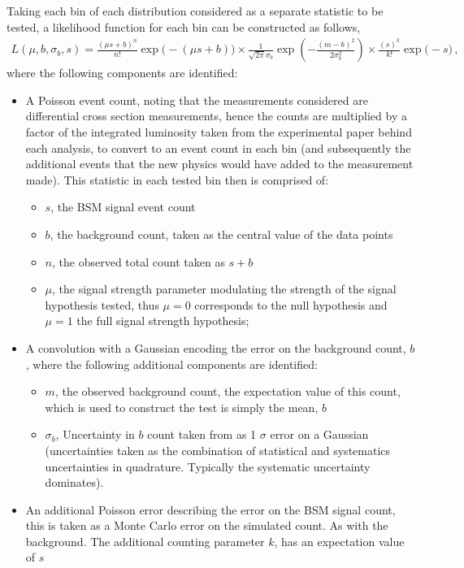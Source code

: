 \documentclass[floatfix]{article}
\begin{document}
Taking each bin of each distribution considered as a separate statistic to be tested, a likelihood function for each bin can be constructed as follows, 
\begin{align}
L(\mu, {b}, {\sigma}_{b}, {s}) = { \frac{(\mu s + b)^{n}}{n!} \exp\big(-(\mu s + b)\big) \times \frac{1}{\sqrt{2 \pi} \sigma_{b}} \exp\left(-\frac{(m - b)^{2}}{2 \sigma_{b}^{2}}\right)} \times \frac{(s)^{k}}{k!}\exp\big(-s\big)\,,
\end{align}
where the following components are identified:
\begin{itemize}
\item A Poisson event count, noting that the measurements considered are differential cross section measurements, hence the counts are multiplied by a factor of the integrated luminosity taken from the experimental paper behind each analysis, to convert to an event count in each bin (and subsequently the additional events that the new physics would have added to the measurement made). This statistic in each tested bin then is comprised of:
\begin{itemize}
\item $s$, the BSM signal event count
\item $b$, the background count, taken as the central value of the data points
\item $n$, the observed total count taken as $s+b$
\item $\mu$, the signal strength parameter modulating the strength of the signal hypothesis tested, thus $\mu=0$ corresponds to the null hypothesis 
and $\mu=1$ the full signal strength hypothesis;
\end{itemize}
\item A convolution with a Gaussian encoding the error on the background count, $b$, where the following additional components are identified:
\begin{itemize}
\item $m$, the observed background count, the expectation value of this count, which is used to construct the test is simply the mean, $b$
\item $\sigma_{b}$, Uncertainty in $b$ count taken from \rivet as 1 $\sigma$ error on a Gaussian (uncertainties taken as the combination of statistical and systematics uncertainties in quadrature. Typically the systematic uncertainty dominates).
\end{itemize}
\item An additional Poisson error describing the error on the BSM signal count, this is taken as a Monte Carlo error on the simulated count. As with the background. The additional counting parameter $k$, has an expectation value of $s$
\end{itemize}
\end{document}
